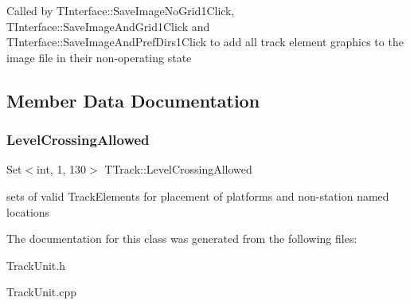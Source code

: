 Called by T\+Interface\+::\+Save\+Image\+No\+Grid1\+Click, T\+Interface\+::\+Save\+Image\+And\+Grid1\+Click and T\+Interface\+::\+Save\+Image\+And\+Pref\+Dirs1\+Click to add all track element graphics to the image file in their non-\/operating state 

\subsection{Member Data Documentation}
\mbox{\label{class_t_track_a29617e6f88e44a7974dc08a371682d0b}} 
\subsubsection{\texorpdfstring{Level\+Crossing\+Allowed}{LevelCrossingAllowed}}
{\footnotesize\ttfamily Set$<$int, 1, 130$>$ T\+Track\+::\+Level\+Crossing\+Allowed\hspace{0.3cm}{\ttfamily [private]}}

sets of valid Track\+Elements for placement of platforms and non-\/station named locations 

The documentation for this class was generated from the following files\+:\begin{DoxyCompactItemize}
\item 
Track\+Unit.\+h\item 
Track\+Unit.\+cpp\end{DoxyCompactItemize}
